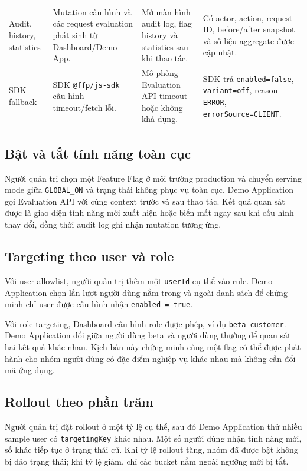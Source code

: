 \begin{table}[H]
\begin{tabular}{p{} p{} p{} p{}}
        Audit, history, statistics & Mutation cấu hình và các request evaluation phát sinh từ Dashboard/Demo App. & Mở màn hình audit log, flag history và statistics sau khi thao tác. & Có actor, action, request ID, before/after snapshot và số liệu aggregate được cập nhật. \\
        SDK fallback & SDK \texttt{@ffp/js-sdk} cấu hình timeout/fetch lỗi. & Mô phỏng Evaluation API timeout hoặc không khả dụng. & SDK trả \texttt{enabled=false}, \texttt{variant=off}, reason \texttt{ERROR}, \texttt{errorSource=CLIENT}. \\
        \bottomrule
    \end{tabular}
\end{table}


\subsection{Bật và tắt tính năng toàn cục}

Người quản trị chọn một Feature Flag ở môi trường production và chuyển serving mode giữa \texttt{GLOBAL\_ON} và trạng thái không phục vụ toàn cục. Demo Application gọi Evaluation API với cùng context trước và sau thao tác. Kết quả quan sát được là giao diện tính năng mới xuất hiện hoặc biến mất ngay sau khi cấu hình thay đổi, đồng thời audit log ghi nhận mutation tương ứng.

\subsection{Targeting theo user và role}

Với user allowlist, người quản trị thêm một \texttt{userId} cụ thể vào rule. Demo Application chọn lần lượt người dùng nằm trong và ngoài danh sách để chứng minh chỉ user được cấu hình nhận \texttt{enabled = true}.

Với role targeting, Dashboard cấu hình role được phép, ví dụ \texttt{beta-customer}. Demo Application đổi giữa người dùng beta và người dùng thường để quan sát hai kết quả khác nhau. Kịch bản này chứng minh cùng một flag có thể được phát hành cho nhóm người dùng có đặc điểm nghiệp vụ khác nhau mà không cần đổi mã ứng dụng.

\subsection{Rollout theo phần trăm}

Người quản trị đặt rollout ở một tỷ lệ cụ thể, sau đó Demo Application thử nhiều sample user có \texttt{targetingKey} khác nhau. Một số người dùng nhận tính năng mới, số khác tiếp tục ở trạng thái cũ. Khi tỷ lệ rollout tăng, nhóm đã được bật không bị đảo trạng thái; khi tỷ lệ giảm, chỉ các bucket nằm ngoài ngưỡng mới bị tắt.

